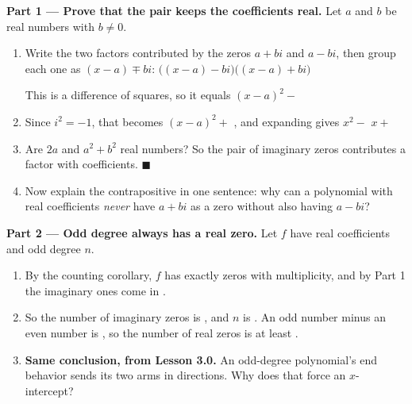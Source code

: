 \documentclass[10pt]{article}
\begin{document}
\begin{tcolorbox}[colback=white, colframe=black!40, title=\textbf{Tier E --- Extension},
    fonttitle=\bfseries, arc=1.5mm, left=3mm, right=3mm, top=2mm, bottom=2mm, breakable]
\textbf{Part 1 --- Prove that the pair keeps the coefficients real.} Let $a$ and $b$ be real numbers
with $b \ne 0$.
\begin{enumerate}[label=(\alph*), leftmargin=1.8em, itemsep=6pt]
  \item Write the two factors contributed by the zeros $a+bi$ and $a-bi$, then group each one as
        $(x-a) \mp bi$: \; $\big((x-a) - bi\big)\big((x-a) + bi\big)$

        \vspace{2pt}
        This is a difference of squares, so it equals $(x-a)^2 - $ 
  \item Since $i^2 = -1$, that becomes $(x-a)^2 + $ , and expanding gives
        $x^2 - $  $x + $ 
  \item Are $2a$ and $a^2+b^2$ real numbers?  \; So the pair of imaginary zeros
        contributes a factor with  coefficients. \; $\blacksquare$
  \item Now explain the contrapositive in one sentence: why can a polynomial with real coefficients
        \emph{never} have $a+bi$ as a zero without also having $a-bi$?
\end{enumerate}

\vspace{5pt}
\textbf{Part 2 --- Odd degree always has a real zero.} Let $f$ have real coefficients and odd degree
$n$.
\begin{enumerate}[label=(\alph*), leftmargin=1.8em, itemsep=6pt]
  \item By the counting corollary, $f$ has exactly  zeros with multiplicity, and by
        Part 1 the imaginary ones come in .
  \item So the number of imaginary zeros is , and $n$ is . An odd number
        minus an even number is , so the number of real zeros is at least
        .
  \item \textbf{Same conclusion, from Lesson 3.0.} An odd-degree polynomial's end behavior sends its
        two arms in  directions. Why does that force an $x$-intercept?
\end{enumerate}


\end{tcolorbox}
\end{document}
